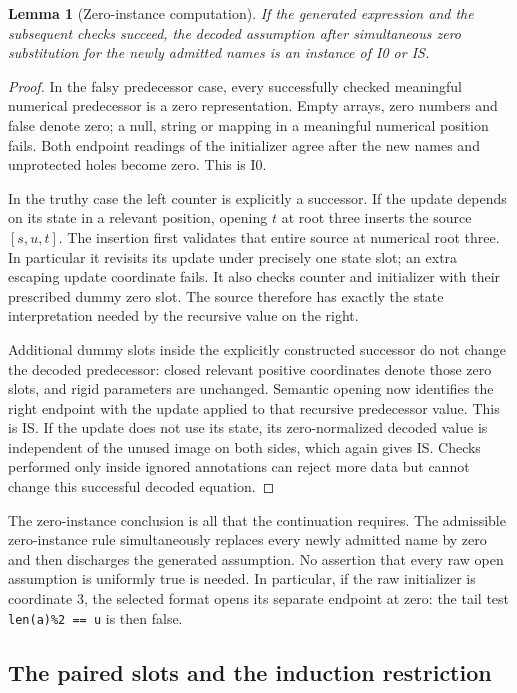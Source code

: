\documentclass[11pt,letterpaper]{article}
\newtheorem{lemma}[theorem]{Lemma}
\theoremstyle{definition}\newtheorem{definition}[theorem]{Definition}
\theoremstyle{remark}\newtheorem{remark}[theorem]{Remark}
\begin{document}
\begin{lemma}[Zero-instance computation]
If the generated expression and the subsequent checks succeed, the
decoded assumption after simultaneous zero substitution for the newly
admitted names is an instance of I0 or IS.
\end{lemma}
\begin{proof}
In the falsy predecessor case, every successfully checked meaningful
numerical predecessor is a zero representation. Empty arrays, zero
numbers and false denote zero; a null, string or mapping in a meaningful
numerical position fails. Both endpoint readings of the initializer
agree after the new names and unprotected holes become zero. This is I0.

In the truthy case the left counter is explicitly a successor.
If the update depends on its state in a relevant position, opening
\(t\) at root three inserts the source \([s,u,t]\). The insertion
first validates that entire source at numerical root three. In
particular it revisits its update under precisely one state slot;
an extra escaping update coordinate fails. It also checks counter
and initializer with their prescribed dummy zero slot. The source
therefore has exactly the state interpretation needed by the
recursive value on the right.

Additional dummy slots inside the explicitly constructed successor
do not change the decoded predecessor: closed relevant positive
coordinates denote those zero slots, and rigid parameters are
unchanged. Semantic opening now identifies the right endpoint with
the update applied to that recursive predecessor value. This is IS.
If the update does not use its state, its zero-normalized decoded
value is independent of the unused image on both sides, which again
gives IS. Checks performed only inside ignored annotations can
reject more data but cannot change this successful decoded equation.
\end{proof}

The zero-instance conclusion is all that the continuation requires.
The admissible zero-instance rule simultaneously replaces every newly
admitted name by zero and then discharges the generated assumption.
No assertion that every raw open assumption is uniformly true is
needed. In particular, if the raw initializer is coordinate \(3\),
the selected format opens its separate endpoint at zero: the tail test
\texttt{len(a)\%2 == u} is then false.

\subsection{The paired slots and the induction restriction}
\end{document}
